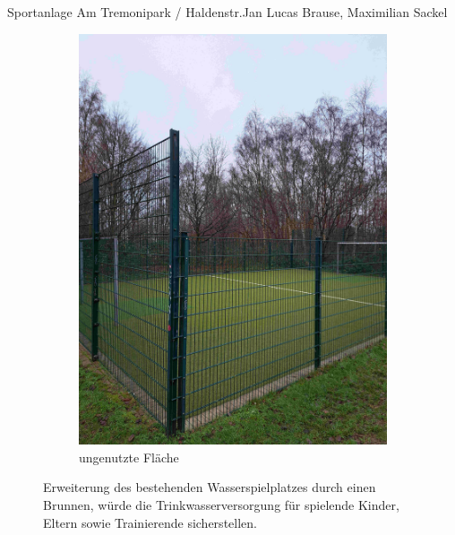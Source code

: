 \documentclass{../../templates/amendment}
\begin{document}
\begin{boxed}{Sportanlage Am Tremonipark / Haldenstr.}{Jan Lucas Brause, Maximilian Sackel}
\begin{figure}[htpb]
\begin{subfigure}[]{0.32\textwidth}
\begin{center}
                \includegraphics[width=\linewidth]{pictures/photo4.jpg}
                \caption{ungenutzte Fläche}%
            \end{center}
        \end{subfigure}
        \caption{Erweiterung des bestehenden Wasserspielplatzes durch einen
            Brunnen, würde die Trinkwasserversorgung für spielende Kinder, Eltern
        sowie Trainierende sicherstellen.}
    \end{figure}


\end{boxed}
\end{document}
